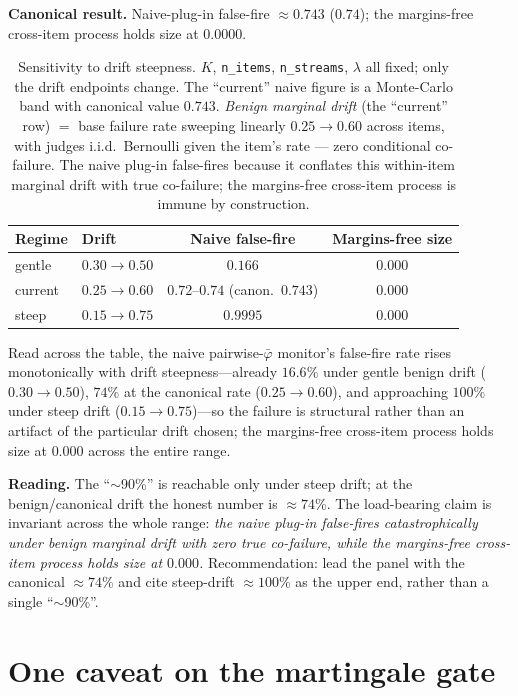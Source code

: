 \documentclass[11pt]{article}
\begin{document}
\textbf{Canonical result.} Naive-plug-in false-fire $\approx 0.743$ ($0.74$); the
margins-free cross-item process holds size at $0.0000$.

\begin{table}[h]
\centering
\begin{tabular}{l l c c}
\toprule
\textbf{Regime} & \textbf{Drift} & \textbf{Naive false-fire} & \textbf{Margins-free size} \\
\midrule
gentle  & $0.30 \to 0.50$ & $0.166$ & $0.000$ \\
current & $0.25 \to 0.60$ & $0.72$--$0.74$ (canon.\ $0.743$) & $0.000$ \\
steep   & $0.15 \to 0.75$ & $0.9995$ & $0.000$ \\
\bottomrule
\end{tabular}
\caption{Sensitivity to drift steepness. $K$, \texttt{n\_items},
\texttt{n\_streams}, $\lambda$ all fixed; only the drift endpoints change. The
``current'' naive figure is a Monte-Carlo band with canonical value $0.743$.
\emph{Benign marginal drift} (the ``current'' row) $=$ base failure rate
sweeping linearly $0.25 \to 0.60$ across items, with judges i.i.d.\ Bernoulli
given the item's rate --- zero conditional co-failure.  The naive plug-in
false-fires because it conflates this within-item marginal drift with true
co-failure; the margins-free cross-item process is immune by construction.}
\end{table}

Read across the table, the naive pairwise-$\bar{\varphi}$ monitor's false-fire rate rises monotonically with drift steepness---already $16.6\%$ under gentle benign drift ($0.30\!\to\!0.50$), $74\%$ at the canonical rate ($0.25\!\to\!0.60$), and approaching $100\%$ under steep drift ($0.15\!\to\!0.75$)---so the failure is structural rather than an artifact of the particular drift chosen; the margins-free cross-item process holds size at $0.000$ across the entire range.

\textbf{Reading.} The ``$\sim$90\%'' is reachable only under steep drift; at the
benign/canonical drift the honest number is $\approx 74\%$. The load-bearing
claim is invariant across the whole range: \emph{the naive plug-in false-fires
catastrophically under benign marginal drift with zero true co-failure, while the
margins-free cross-item process holds size at $0.000$.} Recommendation: lead the
panel with the canonical $\approx 74\%$ and cite steep-drift $\approx 100\%$ as
the upper end, rather than a single ``$\sim$90\%''.

\section{One caveat on the martingale gate}
\end{document}
